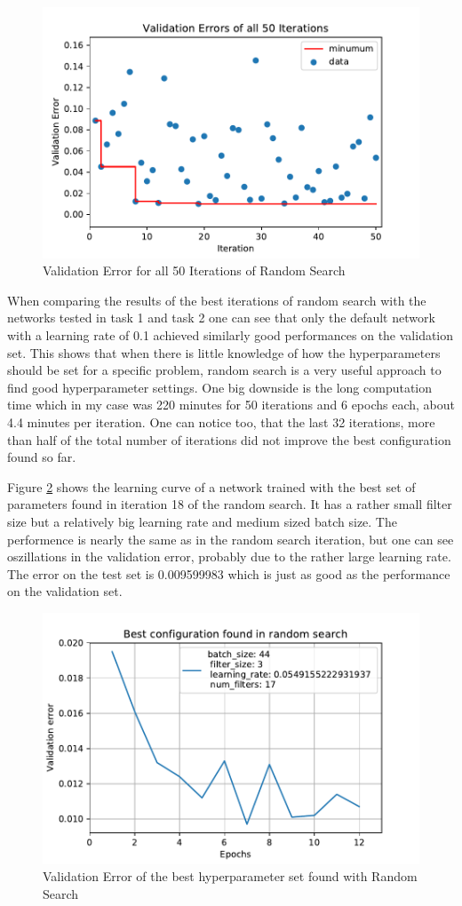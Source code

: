 \documentclass[
        a4paper,
        10pt,
        parskip = full,    %
    ]{scrartcl}
\begin{document}
\begin{figure}
	\includegraphics{../images/ah_random_search.pdf}
	\caption{Validation Error for all 50 Iterations of Random Search}
  \label{RandomSearch}
\end{figure}

When comparing the results of the best iterations of random search with the
networks tested in task 1 and task 2 one can see that only the default network
with a learning rate of 0.1 achieved similarly good performances on the
validation set. This shows that when there is little knowledge of how the
hyperparameters should be set for a specific problem, random search is a very
useful approach to find good hyperparameter settings. One big downside is the
long computation time which in my case was 220 minutes for 50 iterations and 6
epochs each, about 4.4 minutes per iteration. One can notice too, that the last
32 iterations, more than half of the total number of iterations did not improve
the best configuration found so far.

Figure \ref{RandomSearchBestConfig} shows the learning curve of a network
trained with the best set of parameters found in iteration 18 of the random
search. It has a rather small filter size but a relatively big learning rate
and medium sized batch size. The performence is nearly the same as in the random
search iteration, but one can see oszillations in the validation error, probably
due to the rather large learning rate. The error on the test set is
0.009599983 which is just as good as the performance on the validation set.

\begin{figure}
	\includegraphics{../images/Random_Search_Best_Configuration.pdf}
	\caption{Validation Error of the best hyperparameter set found with Random Search}
  \label{RandomSearchBestConfig}
\end{figure}
\end{document}
